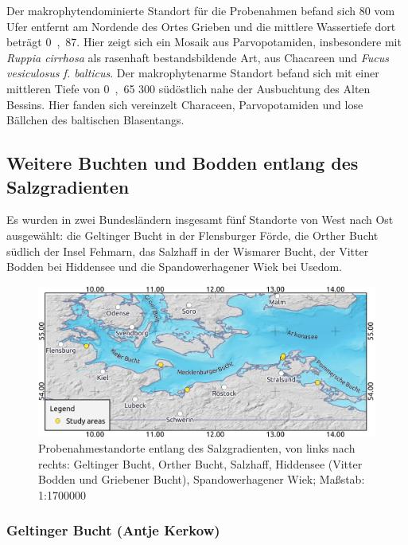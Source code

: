 Der makrophytendominierte Standort für die Probenahmen befand sich \unit{80}{\metre} vom Ufer entfernt am Nordende des Ortes Grieben und die mittlere Wassertiefe dort beträgt \unit{0,87}{\metre}. Hier zeigt sich ein Mosaik aus Parvopotamiden, insbesondere mit \textit{Ruppia cirrhosa} als rasenhaft bestandsbildende Art, aus Chacareen und \textit{Fucus vesiculosus f. balticus}. Der makrophytenarme Standort befand sich mit einer mittleren Tiefe von \unit{0,65}{\metre} \unit{300}{\metre} südöstlich nahe der Ausbuchtung des Alten Bessins. Hier fanden sich vereinzelt Characeen, Parvopotamiden und lose Bällchen des baltischen Blasentangs.



\subsection{Weitere Buchten und Bodden entlang des Salzgradienten}


Es wurden in zwei Bundesländern insgesamt fünf Standorte von West nach Ost ausgewählt: die Geltinger Bucht in der Flensburger Förde, die Orther Bucht südlich der Insel Fehmarn, das Salzhaff in der Wismarer Bucht, der Vitter Bodden bei Hiddensee und die Spandowerhagener Wiek bei Usedom.


\begin{figure}[htb]
\centering
\includegraphics[width=1\textwidth]{images/Uebersicht.png}
\caption[Übersichtskarte der Probenahmestandorte entlang des Salzgradienten]{Probenahmestandorte entlang des Salzgradienten, von links nach rechts: Geltinger Bucht, Orther Bucht, Salzhaff, Hiddensee (Vitter Bodden und Griebener Bucht), Spandowerhagener Wiek; Maßstab: 1:1700000}
\label{Uebersicht}
\end{figure}




\subsubsection{Geltinger Bucht (Antje Kerkow)}


